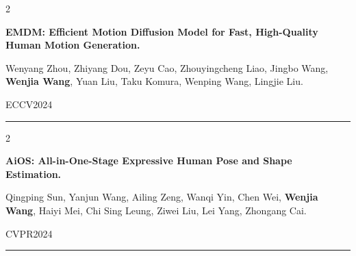 \documentclass[10pt, letterpaper]{article}
\newenvironment{twocolentry}[2][]{
    \onecolentry
    \def\secondColumn{#2}
    \setcolumnwidth{\fill, 4.5 cm}
    \begin{paracol}{2}
}{
    \switchcolumn \raggedleft \secondColumn
    \end{paracol}
    \endonecolentry
} %
\begin{document}
        \begin{samepage}
            \begin{twocolentry}{
               ECCV2024
            }
                \textbf{EMDM: Efficient Motion Diffusion Model for Fast, High-Quality Human Motion Generation.}

                \vspace{0.10 cm}
                \small Wenyang Zhou, Zhiyang Dou, Zeyu Cao, Zhouyingcheng Liao, Jingbo Wang, \textbf{Wenjia Wang}, Yuan Liu, Taku Komura, Wenping Wang, Lingjie Liu.
            \end{twocolentry}

 \vspace{-0.15 cm}
        \end{samepage}

        {\color{gray!40}\noindent\rule{0.98\textwidth}{0.3pt}}
        
        \begin{samepage}
            \begin{twocolentry}{
               CVPR2024
            }
                \textbf{AiOS: All-in-One-Stage Expressive Human Pose and Shape Estimation.}

                \vspace{0.10 cm}
                \small Qingping Sun, Yanjun Wang, Ailing Zeng, Wanqi Yin, Chen Wei, \textbf{Wenjia Wang}, Haiyi Mei, Chi Sing Leung, Ziwei Liu, Lei Yang, Zhongang Cai.
            \end{twocolentry}

         \vspace{-0.15 cm}
        \end{samepage}

        {\color{gray!40}\noindent\rule{0.98\textwidth}{0.3pt}}
        
\end{document}
